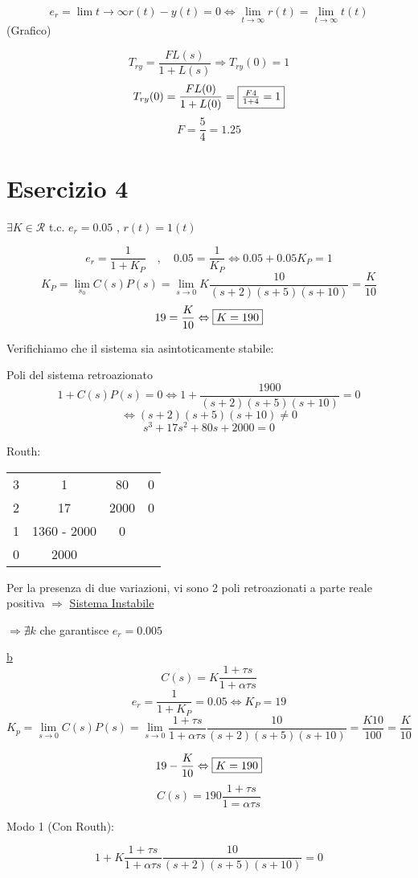 \documentclass{article}
\begin{document}
\[ e_r = \lim{t \to \infty} r(t)-y(t) = 0 \Leftrightarrow \lim _{t\to \infty} r(t) = \lim_{t\to\infty} t(t) \]
(Grafico)

\[ T_{ry} = \frac{FL(s)}{1 + L(s)} \Rightarrow T_{ry}(0) = 1\]
\[ T_{ry}(0) = \frac{FL(0)}{1+L(0)} = \framebox{$\frac{F4}{1+4} = 1$} \]
\[ F= \frac{5}{4} = 1.25 \]


\section{Esercizio 4}

$\exists K \in \mathcal{R} $ t.c. $e_r = 0.05$ , $r(t) = 1(t)$

\[ e_r = \frac{1}{1+K_P} \quad , \quad 0.05=\frac{1}{K_P} \Leftrightarrow 0.05 + 0.05 K_P = 1\]
\[K_P = \lim_{s_0} C(s)P(s) = \lim_{s\to 0} K \frac{10}{(s+2)(s+5)(s+10)} = \frac{K}{10}\]
\[ 19 = \frac{K}{10} \Leftrightarrow \framebox{$K = 190$} \]

Verifichiamo che il sistema sia asintoticamente stabile:

Poli del sistema retroazionato
\[ 1 + C(s)P(s) = 0 \Leftrightarrow 1 + \frac{1900}{(s+2)(s+5)(s+10)} = 0\]
\[ \Leftrightarrow (s+2)(s+5)(s+10) \neq 0\]
\[ s^3 + 17s^2 + 80 s + 2000 = 0\]

Routh:

\begin{tabular}{c|c c c}
        3 & 1 & 80 & 0\\
        2 & 17 & 2000 & 0\\
        1 & 1360 - 2000 & 0\\
        0 & 2000
\end{tabular}

Per la presenza di due variazioni, vi sono 2 poli retroazionati a parte reale positiva $\Rightarrow$ \underline{Sistema Instabile}

$\Rightarrow \nexists k$  che garantisce $e_r = 0.005$


\underline{b}
\[ C(s) = K\frac{1 + \tau s}{1 + \alpha \tau s} \]
\[ e_r = \frac{1}{1 + K_P} = 0.05 \Leftrightarrow K_P = 19\]
\[ K_p = \lim_{s \to 0} C(s)P(s) = \lim_{s \to 0} \frac{1 + \tau s}{1 + \alpha \tau s} \frac{10}{(s+2)(s+5)(s+10)} = \frac{K 10}{100} = \frac{K}{10} \]

\[ 19 - \frac{K}{10} \Leftrightarrow \framebox{$ K = 190 $} \]
\[ C(s) = 190 \frac{1 + \tau s}{1 = \alpha \tau s} \]

Modo 1 (Con Routh):


\[ 1 + K \frac{1 + \tau s }{1 + \alpha \tau s }\frac {10}{(s+2)(s+5) (s+10)} =  0\]
\end{document}
